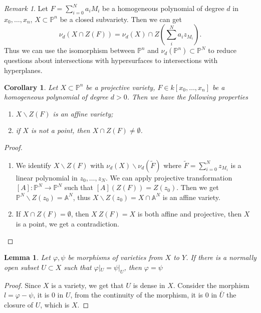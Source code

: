 \documentclass{amsart}
\theoremstyle{plain}
\newtheorem{corollary}{Corollary}
\newtheorem{lemma}{Lemma}
\theoremstyle{definition}
\theoremstyle{remark}
\newtheorem*{remark}{Remark}
\numberwithin{equation}{section}
\begin{document}
\begin{remark}
	Let $ F=\sum\limits_{i=0}^{N}a_iM_i $ be a homogeneous polynomial of degree $ d $ in $ x_0,\dots,x_n $, $ X\subset\mathbb{P}^n $ be a closed subvariety. Then we can get 
	\begin{equation}
		\nu_d(X\cap Z(F))=\nu_d(X)\cap Z(\sum\limits_i^{N}a_iz_{M_i}).
	\end{equation}
	Thus we can use the isomorphism between $ \mathbb{P}^n $ and $ \nu_d(\mathbb{P}^n)\subset \mathbb{P}^N $ to reduce questions about intersections with hypersurfaces to intersections with hyperplanes.
\end{remark}
\begin{corollary}
	Let $ X\subset \mathbb{P}^n $ be a projective variety, $ F\in k[x_0,\dots,x_n] $ be a homogeneous polynomial of degree $ d>0 $. Then we have the following properties
	\begin{enumerate}
		\item $ X\backslash Z(F) $ is an affine variety;
		\item if $ X $ is not a point, then $ X\cap Z(F)\neq \emptyset $. 
	\end{enumerate}
\end{corollary}
\begin{proof}
	\noindent\begin{enumerate}
		\item We identify $ X\backslash Z(F) $ with $ \nu_d(X)\backslash \nu_d(\tilde{F}) $ where $ \tilde{F}=\sum\limits_{i=0}^{N}z_{M_i} $ is a linear polynomial in $ z_0,\dots,z_N $. We can apply projective transformation $ [A]:\mathbb{P}^N\to \mathbb{P}^N $ such that $ [A](Z(F))=Z(z_0) $. Then we get $ \mathbb{P}^N\backslash Z(z_0)=\mathbb{A}^N $, thus $ X\backslash Z(z_0) =X\cap\mathbb{A}^N$ is an affine variety.
		\item If $ X\cap Z(F)=\emptyset $, then $ X\ Z(F)=X $ is both affine and projective, then $ X $ is a point, we get a contradiction.	
		\end{enumerate}
\end{proof}
\begin{lemma}
	Let $ \varphi,\psi $ be morphisms of varieties from $ X $ to $ Y $. If there is a normally open subset $ U\subset X $ such that $ \varphi|_U=\psi|_U $, then $ \varphi=\psi $
\end{lemma}
\begin{proof}
	Since $ X $ is a variety, we get that $ U $ is dense in $ X $. Consider the morphism $ l=\varphi-\psi $, it is $ 0 $ in $ U $, from the continuity of the morphism, it is $ 0 $ in $ \bar{U} $ the closure of $ U $, which is $ X $.
\end{proof}
\end{document}
